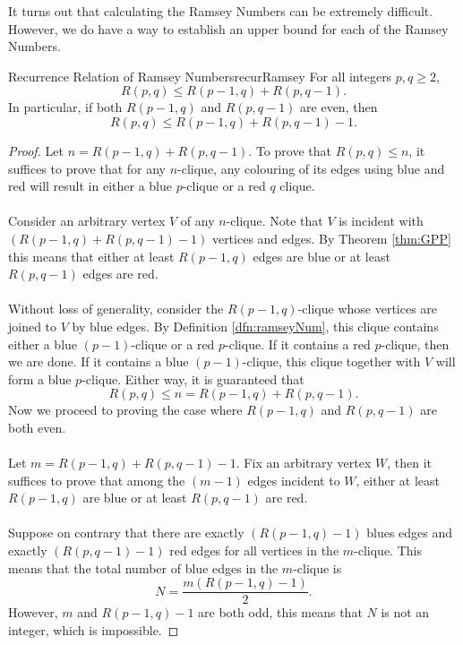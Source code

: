 \documentclass[math]{amznotes}
\theoremstyle{remark}
\begin{document}
It turns out that calculating the Ramsey Numbers can be extremely difficult. However, we do have a way to establish an upper bound for each of the Ramsey Numbers.
\begin{thmbox}{Recurrence Relation of Ramsey Numbers}{recurRamsey}
    For all integers $p, q \geq 2$,
    \begin{equation*}
        R(p, q) \leq R(p - 1, q) + R(p, q - 1).
    \end{equation*}
    In particular, if both $R(p - 1, q)$ and $R(p, q - 1)$ are even, then
    \begin{equation*}
        R(p, q) \leq R(p - 1, q) + R(p, q - 1) - 1.
    \end{equation*}
    \tcblower
    \begin{proof}
        Let $n = R(p - 1, q) + R(p, q - 1)$. To prove that $R(p, q) \leq n$, it suffices to prove that for any $n$-clique, any colouring of its edges using blue and red will result in either a blue $p$-clique or a red $q$ clique.
        \\\\
        Consider an arbitrary vertex $V$ of any $n$-clique. Note that $V$ is incident with $\left(R(p - 1, q) + R(p, q - 1) - 1\right)$ vertices and edges. By Theorem \ref{thm:GPP} this means that either at least $R(p - 1, q)$ edges are blue or at least $R(p, q - 1)$ edges are red.
        \\\\ 
        Without loss of generality, consider the $R(p - 1, q)$-clique whose vertices are joined to $V$ by blue edges. By Definition \ref{dfn:ramseyNum}, this clique contains either a blue $(p - 1)$-clique or a red $p$-clique. If it contains a red $p$-clique, then we are done. If it contains a blue $(p - 1)$-clique, this clique together with $V$ will form a blue $p$-clique. Either way, it is guaranteed that
        \begin{equation*}
            R(p, q) \leq n = R(p - 1, q) + R(p, q - 1).
        \end{equation*}
        Now we proceed to proving the case where $R(p - 1, q)$ and $R(p, q - 1)$ are both even.
        \\\\
        Let $m = R(p - 1, q) + R(p, q - 1) - 1$. Fix an arbitrary vertex $W$, then it suffices to prove that among the $(m - 1)$ edges incident to $W$, either at least $R(p - 1, q)$ are blue or at least $R(p, q - 1)$ are red.
        \\\\
        Suppose on contrary that there are exactly $\left(R(p - 1, q) - 1\right)$ blues edges and exactly $\left(R(p, q - 1) - 1\right)$ red edges for all vertices in the $m$-clique. This means that the total number of blue edges in the $m$-clique is
        \begin{equation*}
            N = \frac{m\left(R(p - 1, q) - 1\right)}{2}.
        \end{equation*}
        However, $m$ and $R(p - 1, q) - 1$ are both odd, this means that $N$ is not an integer, which is impossible.
    \end{proof}
\end{thmbox}
\end{document}
